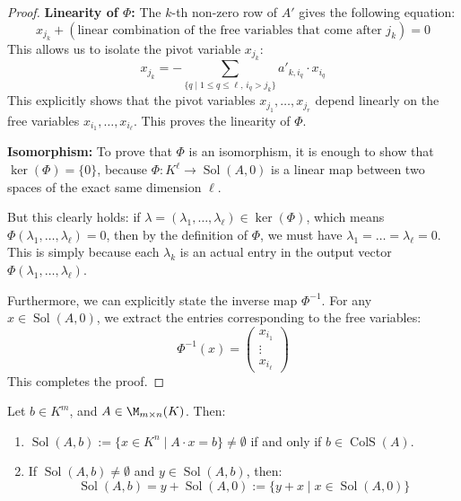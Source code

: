 \begin{proof}
\textbf{Linearity of $\Phi$:} The $k$-th non-zero row of $A'$ gives the following equation:
\begin{equation*}
    x_{j_k} + (\text{linear combination of the free variables that come after } j_k) = 0
\end{equation*}
This allows us to isolate the pivot variable $x_{j_k}$:
\begin{equation*}
    x_{j_k} = - \sum_{\{q \mid 1 \le q \le \ell, \, i_q > j_k\}} a'_{k, i_q} \cdot x_{i_q}
\end{equation*}
This explicitly shows that the pivot variables $x_{j_1}, \dots, x_{j_r}$ depend linearly on the free variables $x_{i_1}, \dots, x_{i_\ell}$. This proves the linearity of $\Phi$.

\textbf{Isomorphism:} To prove that $\Phi$ is an isomorphism, it is enough to show that $\ker(\Phi) = \{0\}$, because $\Phi: K^\ell \to \operatorname{Sol}(A, 0)$ is a linear map between two spaces of the exact same dimension $\ell$.

But this clearly holds: if $\lambda = (\lambda_1, \dots, \lambda_\ell) \in \ker(\Phi)$, which means $\Phi(\lambda_1, \dots, \lambda_\ell) = 0$, then by the definition of $\Phi$, we must have $\lambda_1 = \dots = \lambda_\ell = 0$. This is simply because each $\lambda_k$ is an actual entry in the output vector $\Phi(\lambda_1, \dots, \lambda_\ell)$.

Furthermore, we can explicitly state the inverse map $\Phi^{-1}$. For any $x \in \operatorname{Sol}(A, 0)$, we extract the entries corresponding to the free variables:
\begin{equation*}
    \Phi^{-1}(x) = \begin{pmatrix} x_{i_1} \\ \vdots \\ x_{i_\ell} \end{pmatrix}
\end{equation*}
This completes the proof.
\end{proof}

\begin{corollary}
\label{cor:non_homogeneous_solutions}
Let $b \in K^m$, and $A \in \M_{m \times n}(K)$. Then:
\begin{enumerate}
    \item $\operatorname{Sol}(A, b) := \{x \in K^n \mid A \cdot x = b\} \neq \emptyset$ if and only if $b \in \operatorname{ColS}(A)$.
    \item If $\operatorname{Sol}(A, b) \neq \emptyset$ and $y \in \operatorname{Sol}(A, b)$, then:
    \begin{equation*}
        \operatorname{Sol}(A, b) = y + \operatorname{Sol}(A, 0) := \{y + x \mid x \in \operatorname{Sol}(A, 0)\}
    \end{equation*}
\end{enumerate}
\end{corollary}

